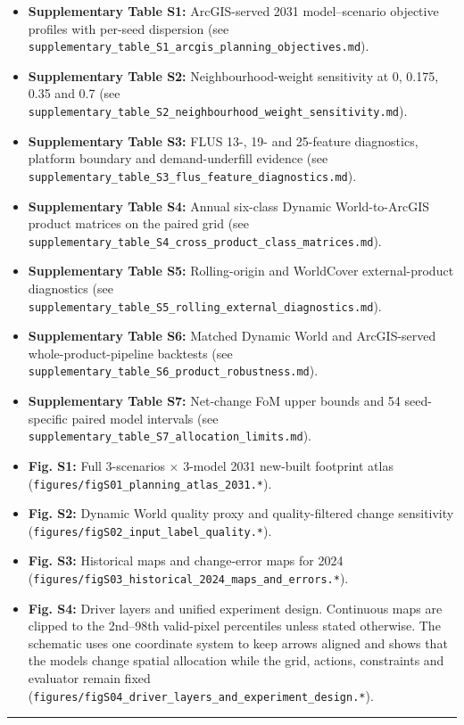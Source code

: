 \begin{itemize}
\tightlist
\item
  \textbf{Supplementary Table S1:} ArcGIS-served 2031 model--scenario
  objective profiles with per-seed dispersion (see
  \texttt{supplementary\_table\_S1\_arcgis\_planning\_objectives.md}).
\item
  \textbf{Supplementary Table S2:} Neighbourhood-weight sensitivity at
  0, 0.175, 0.35 and 0.7 (see
  \texttt{supplementary\_table\_S2\_neighbourhood\_weight\_sensitivity.md}).
\item
  \textbf{Supplementary Table S3:} FLUS 13-, 19- and 25-feature
  diagnostics, platform boundary and demand-underfill evidence (see
  \texttt{supplementary\_table\_S3\_flus\_feature\_diagnostics.md}).
\item
  \textbf{Supplementary Table S4:} Annual six-class Dynamic
  World-to-ArcGIS product matrices on the paired grid (see
  \texttt{supplementary\_table\_S4\_cross\_product\_class\_matrices.md}).
\item
  \textbf{Supplementary Table S5:} Rolling-origin and WorldCover
  external-product diagnostics (see
  \texttt{supplementary\_table\_S5\_rolling\_external\_diagnostics.md}).
\item
  \textbf{Supplementary Table S6:} Matched Dynamic World and
  ArcGIS-served whole-product-pipeline backtests (see
  \texttt{supplementary\_table\_S6\_product\_robustness.md}).
\item
  \textbf{Supplementary Table S7:} Net-change FoM upper bounds and 54
  seed-specific paired model intervals (see
  \texttt{supplementary\_table\_S7\_allocation\_limits.md}).
\item
  \textbf{Fig. S1:} Full 3-scenarios × 3-model 2031 new-built footprint
  atlas (\texttt{figures/figS01\_planning\_atlas\_2031.*}).
\item
  \textbf{Fig. S2:} Dynamic World quality proxy and quality-filtered
  change sensitivity (\texttt{figures/figS02\_input\_label\_quality.*}).
\item
  \textbf{Fig. S3:} Historical maps and change-error maps for 2024
  (\texttt{figures/figS03\_historical\_2024\_maps\_and\_errors.*}).
\item
  \textbf{Fig. S4:} Driver layers and unified experiment design.
  Continuous maps are clipped to the 2nd--98th valid-pixel percentiles
  unless stated otherwise. The schematic uses one coordinate system to
  keep arrows aligned and shows that the models change spatial
  allocation while the grid, actions, constraints and evaluator remain
  fixed
  (\texttt{figures/figS04\_driver\_layers\_and\_experiment\_design.*}).
\end{itemize}

\begin{center}\rule{0.5\linewidth}{0.5pt}\end{center}
